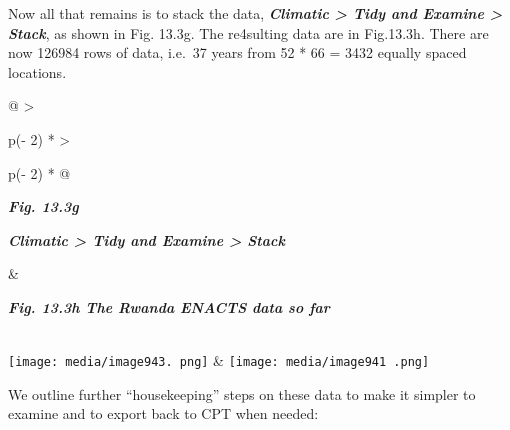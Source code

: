 \documentclass[
  letterpaper,
  DIV=11,
  numbers=noendperiod]{scrreprt}
\begin{document}
Now all that remains is to stack the data, \textbf{\emph{Climatic
\textgreater{} Tidy and Examine \textgreater{} Stack}}, as shown in Fig.
13.3g. The re4sulting data are in Fig.13.3h. There are now 126984 rows
of data, i.e.~37 years from 52 * 66 = 3432 equally spaced locations.

\begin{longtable}[]{@{}
  >{\raggedright\arraybackslash}p{(\columnwidth - 2\tabcolsep) * }
  >{\raggedright\arraybackslash}p{(\columnwidth - 2\tabcolsep) * }@{}}
\toprule\noalign{}
\begin{minipage}[b]{\linewidth}\raggedright
\textbf{\emph{Fig. 13.3g}}

\textbf{\emph{Climatic \textgreater{} Tidy and Examine \textgreater{}
Stack}}
\end{minipage} & \begin{minipage}[b]{\linewidth}\raggedright
\textbf{\emph{Fig. 13.3h The Rwanda ENACTS data so far}}
\end{minipage} \\
\midrule\noalign{}
\endhead
\bottomrule\noalign{}
\endlastfoot
\texttt{[image: media/image943. png]}
&
\texttt{[image: media/image941 .png]} \\
\end{longtable}

We outline further ``housekeeping'' steps on these data to make it
simpler to examine and to export back to CPT when needed:
\end{document}
